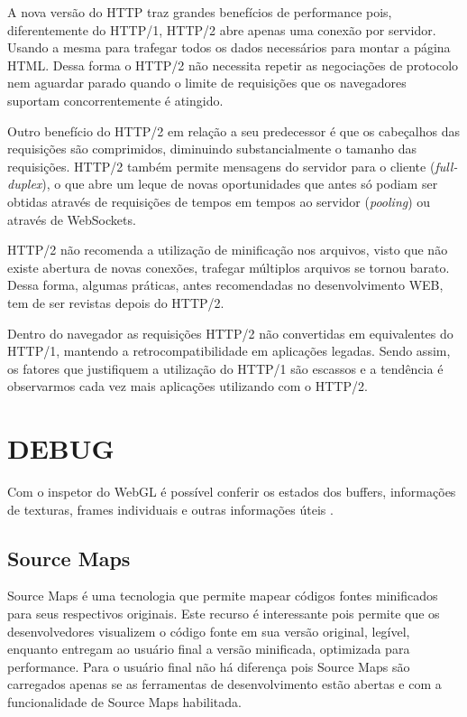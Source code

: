A nova versão do HTTP traz grandes benefícios de performance
pois, diferentemente do HTTP/1, HTTP/2 abre apenas uma conexão por
servidor. Usando a mesma para trafegar todos os dados necessários para
montar a página HTML. Dessa forma o HTTP/2 não necessita repetir
as negociações de protocolo nem aguardar parado quando o limite de
requisições que os navegadores suportam concorrentemente é atingido.

Outro benefício do HTTP/2 em relação a seu predecessor é que
os cabeçalhos das requisições são comprimidos, diminuindo
substancialmente o tamanho das requisições. HTTP/2 também permite
mensagens do servidor para o cliente (\textit{full-duplex}), o
que abre um leque de novas oportunidades que antes só podiam ser
obtidas através de requisições de tempos em tempos ao servidor
(\textit{pooling}) ou através de WebSockets.

HTTP/2 não recomenda a utilização de minificação nos arquivos,
visto que não existe abertura de novas conexões, trafegar múltiplos
arquivos se tornou barato. Dessa forma, algumas práticas, antes
recomendadas no desenvolvimento WEB, tem de ser revistas depois do
HTTP/2.

Dentro do navegador as requisições HTTP/2 não convertidas em
equivalentes do HTTP/1, mantendo a retrocompatibilidade em aplicações
legadas. Sendo assim, os fatores que justifiquem a utilização do HTTP/1
são escassos e a tendência é observarmos cada vez mais aplicações
utilizando com o HTTP/2.

\section{DEBUG}
\begin{draft}
Com o inspetor do WebGL é possível conferir os estados dos buffers, informações de texturas, frames individuais e outras informações úteis \autocite{html5mostwanted}.
\end{draft}

\subsection{Source Maps}

Source Maps é uma tecnologia que permite mapear códigos fontes
minificados para seus respectivos originais. Este recurso é
interessante pois permite que os desenvolvedores visualizem o código
fonte em sua versão original, legível, enquanto entregam ao usuário
final a versão minificada, optimizada para performance.
Para o usuário final não há diferença pois Source Maps são
carregados apenas se as ferramentas de desenvolvimento estão abertas e
com a funcionalidade de Source Maps habilitada.

